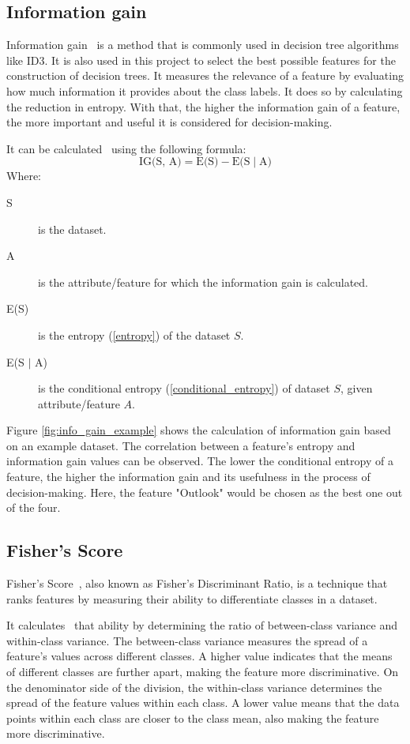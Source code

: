 \subsection{Information gain} \label{information_gain}
Information gain~\cite{feature_selection} is a method that is commonly used in decision tree algorithms like ID3. It is also used in this project to select the best possible features for the construction of decision trees. It measures the relevance of a feature by evaluating how much information it provides about the class labels. It does so by calculating the reduction in entropy. With that, the higher the information gain of a feature, the more important and useful it is considered for decision-making.

It can be calculated~\cite{information_gain_wiki} using the following formula:
\[ \text{IG(S, A)} = \text{E(S)} - \text{E(S}\mid \text{A)}\]
Where:
\begin{description}
	\item[S] is the dataset.
	\item[A] is the attribute/feature for which the information gain is calculated.
    \item[E(S)] is the entropy (\ref{entropy}) of the dataset $S$.
    \item[E(S $\mid$ A)] is the conditional entropy (\ref{conditional_entropy}) of dataset $S$, given attribute/feature $A$.
\end{description}

Figure \ref{fig:info_gain_example} shows the calculation of information gain based on an example dataset.
The correlation between a feature's entropy and information gain values can be observed. The lower the conditional entropy of a feature, the higher the information gain and its usefulness in the process of decision-making. Here, the feature "Outlook" would be chosen as the best one out of the four.

\subsection{Fisher's Score}
Fisher's Score~\cite{feature_selection}, also known as Fisher's Discriminant Ratio, is a technique that ranks features by measuring their ability to differentiate classes in a dataset.

It calculates~\cite{8abf67a05c864edc85fbc3af89c826a8} that ability by determining the ratio of between-class variance and within-class variance. The between-class variance measures the spread of a feature's values across different classes. A higher value indicates that the means of different classes are further apart, making the feature more discriminative. On the denominator side of the division, the within-class variance determines the spread of the feature values within each class. A lower value means that the data points within each class are closer to the class mean, also making the feature more discriminative.

